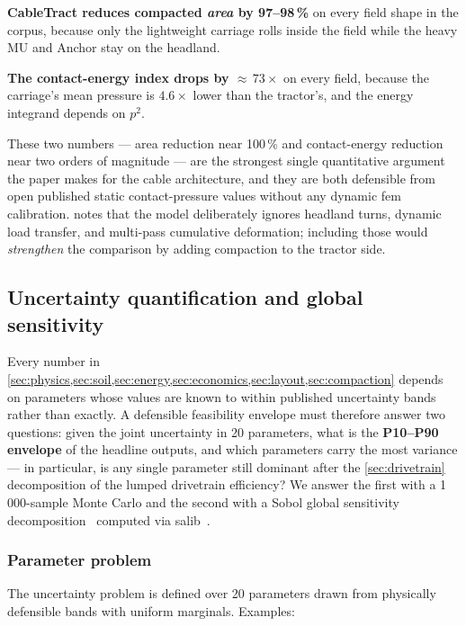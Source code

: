 \documentclass[11pt,a4paper]{article}
\begin{document}
\textbf{CableTract reduces compacted \emph{area} by 97--98\,\%} on every field shape in the corpus, because only the lightweight carriage rolls inside the field while the heavy MU and Anchor stay on the headland.

\textbf{The contact-energy index drops by ${\approx}\,73\times$} on every field, because the carriage's mean pressure is $4.6\times$ lower than the tractor's, and the energy integrand depends on $p^{2}$.

These two numbers --- area reduction near 100\,\% and contact-energy reduction near two orders of magnitude --- are the strongest single quantitative argument the paper makes for the cable architecture, and they are both defensible from open published static contact-pressure values without any dynamic \gls{fem} calibration.  notes that the model deliberately ignores headland turns, dynamic load transfer, and multi-pass cumulative deformation; including those would \emph{strengthen} the comparison by adding compaction to the tractor side.

\subsection{Uncertainty quantification and global sensitivity}\label{sec:uq}

Every number in \cref{sec:physics,sec:soil,sec:energy,sec:economics,sec:layout,sec:compaction} depends on parameters whose values are known to within published uncertainty bands rather than exactly. A defensible feasibility envelope must therefore answer two questions: given the joint uncertainty in 20 parameters, what is the \textbf{P10--P90 envelope} of the headline outputs, and which parameters carry the most variance --- in particular, is any single parameter still dominant after the \cref{sec:drivetrain} decomposition of the lumped drivetrain efficiency? We answer the first with a 1\,000-sample Monte Carlo and the second with a Sobol global sensitivity decomposition~\cite{sobol2001indices,saltelli2008primer} computed via \gls{salib}~\cite{herman2017salib,iwanaga2022salib}.

\subsubsection{Parameter problem}\label{sec:uq-problem}

The uncertainty problem is defined over 20 parameters drawn from physically defensible bands with uniform marginals. Examples:
\end{document}
